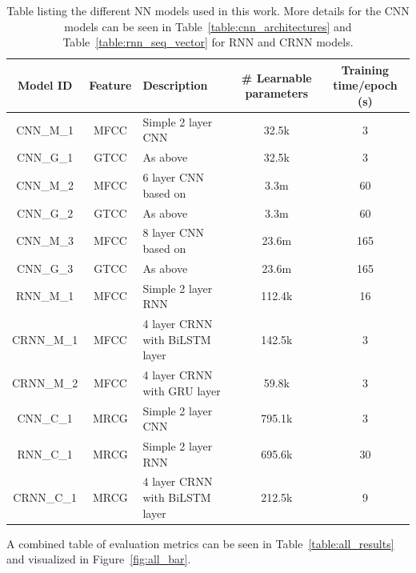 \begin{table}
\begin{center}
\begin{tabular}{c c l c c}
\toprule
Model ID & Feature & Description & \# Learnable parameters & Training time/epoch (s) \\ [0.5ex]
\midrule
CNN\_M\_1 & MFCC & Simple 2 layer CNN & 32.5k & 3 \\
CNN\_G\_1 & GTCC & As above & 32.5k & 3 \\
CNN\_M\_2 & MFCC & 6 layer CNN based on~\cite{ruff2020automated} & 3.3m & 60 \\
CNN\_G\_2 & GTCC & As above & 3.3m & 60 \\
CNN\_M\_3 & MFCC & 8 layer CNN based on~\cite{kahl2017large} & 23.6m & 165 \\
CNN\_G\_3 & GTCC & As above & 23.6m & 165 \\
RNN\_M\_1 & MFCC & Simple 2 layer RNN & 112.4k & 16 \\
CRNN\_M\_1 & MFCC & 4 layer CRNN with BiLSTM layer & 142.5k & 3 \\
CRNN\_M\_2 & MFCC & 4 layer CRNN with GRU layer & 59.8k & 3 \\
CNN\_C\_1 & MRCG & Simple 2 layer CNN & 795.1k & 3 \\
RNN\_C\_1 & MRCG & Simple 2 layer RNN & 695.6k & 30 \\
CRNN\_C\_1 & MRCG & 4 layer CRNN with BiLSTM layer & 212.5k & 9 \\
\bottomrule
\end{tabular}
\caption{Table listing the different NN models used in this work. More details
for the CNN models can be seen in Table~\ref{table:cnn_architectures} and
Table~\ref{table:rnn_seq_vector} for RNN and CRNN models.}\label{table:nn_models}
\end{center}
\end{table}

A combined table of evaluation metrics can be seen in
Table~\ref{table:all_results} and visualized in Figure~\ref{fig:all_bar}.

